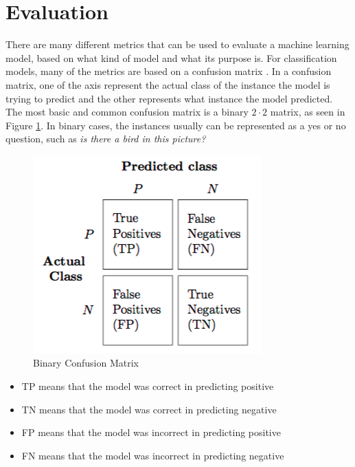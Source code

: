 \documentclass[nofilelist]{cslthse-msc}
\begin{document}
\section{Evaluation}
There are many different metrics that can be used to evaluate a machine learning model, based on what kind of model and what its purpose is. For classification models, many of the metrics are based on a confusion matrix \citep{FAWCETT2006861}. In a confusion matrix, one of the axis represent the actual class of the instance the model is trying to predict and the other represents what instance the model predicted. The most basic and common confusion matrix is a binary $2 \cdot 2$ matrix, as seen in Figure \ref{fig:confusion}. In binary cases, the instances usually can be represented as a yes or no question, such as \textit{is there a bird in this picture?}

\begin{figure}[h!]
    \centering
    \includegraphics[width=\textwidth/2]{msccls/explanatory_images/confusion_matrix.png}
    \caption{Binary Confusion Matrix}
    \label{fig:confusion}
\end{figure}

\begin{itemize}
    \item TP means that the model was correct in predicting positive
    \item TN means that the model was correct in predicting negative
    \item FP means that the model was incorrect in predicting positive
    \item FN means that the model was incorrect in predicting negative
\end{itemize}
\end{document}
